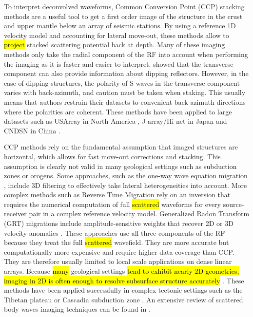 \documentclass[10pt,a4paper]{article}
\begin{document}
To interpret deconvolved waveforms, Common Conversion Point (CCP) stacking methods \citep{tess_gpro_88,duek_jgr_97} are a useful tool to get a first order image of the structure in the crust and upper mantle below an array of seismic stations.
By using a reference 1D velocity model and accounting for lateral move-out, these methods allow to \hl{project} stacked scattering potential back at depth.
Many of these imaging methods only take the radial component of the RF into account when performing the imaging as it is faster and easier to interpret.
\citet{tone_epsl_08} showed that the transverse component can also provide information about dipping reflectors.
However, in the case of dipping structures, the polarity of S-waves in the transverse component varies with back-azimuth, and caution must be taken when staking.
This usually means that authors restrain their datasets to convenient back-azimuth directions where the polarities are coherent. 
These methods have been applied to large datasets such as USArray in North America \citep{leva_ggg_12}, J-array/Hi-net in Japan \citep{yama_eps_03} and CNDSN in China \citep{chen_jgr_10}.

CCP methods rely on the fundamental assumption that imaged structures are horizontal, which allows for fast move-out corrections and stacking. 
This assumption is clearly not valid in many geological settings such as subduction zones or orogens. 
Some approaches, such as the one-way wave equation migration \citep{chen_jgr_05}, include 3D filtering to effectively take lateral heterogeneities into account. 
More complex methods such as Reverse Time Migration \citep[RTM,][]{burd_gji_13} rely on an inversion that requires the numerical computation of full \hl{scattered} waveforms for every source-receiver pair in a complex reference velocity model. 
Generalized Radon Transform (GRT) migrations include amplitude-sensitive weights that recover 2D or 3D velocity anomalies \citep[see, e.g.,][]{bost_jgr_01,pavl_cg_11}. 
These approaches use all three components of the RF because they treat the full \hl{scattered} wavefield. 
They are more accurate but computationally more expensive \citep{rond_sgeo_09} and require higher data coverage than CCP. 
They are therefore usually limited to local scale applications on dense linear arrays. 
Because \hl{many} geological settings \hl{tend to exhibit nearly 2D geometries, imaging in 2D is often enough to resolve subsurface structure accurately} \citep[see, e.g.,][]{pear_jgr_12}. 
These methods have been applied successfully in complex tectonic settings such as the Tibetan plateau \citep{shan_gji_17} or Cascadia subduction zone \citep{rond_jgr_01,aber_geol_09}.
An extensive review of scattered body waves imaging techniques can be found in \citet{rond_sgeo_09}.
\end{document}
